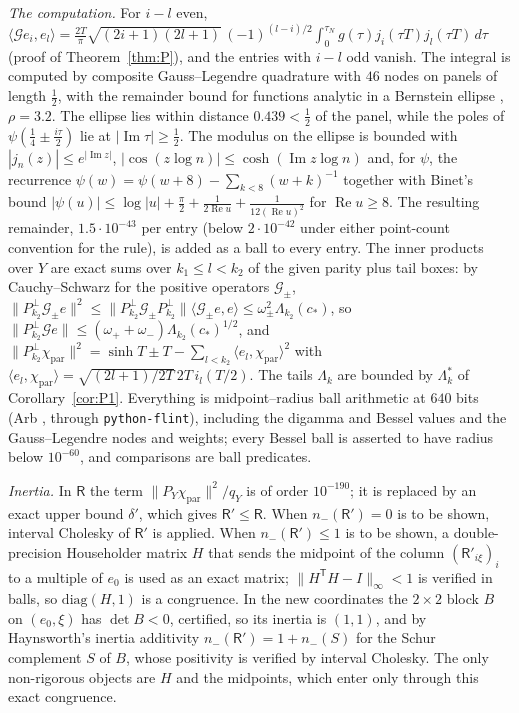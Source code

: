 \documentclass[11pt]{amsart}
\theoremstyle{definition}
\theoremstyle{remark}
\newcommand{\Rel}{\operatorname{Re}}
\newcommand{\Iml}{\operatorname{Im}}
\begin{document}
\emph{The computation.} For $i-l$ even,
$\langle\mathcal Ge_i,e_l\rangle=\frac{2T}\pi\sqrt{(2i+1)(2l+1)}\,(-1)^{(l-i)/2}\int_0^{\tau_N}g(\tau)j_i(\tau T)j_l(\tau T)\,d\tau$
(proof of Theorem~\ref{thm:P}), and the entries with $i-l$ odd vanish. The integral is computed by composite
Gauss--Legendre quadrature with $46$ nodes on panels of length $\frac12$, with the remainder bound for
functions analytic in a Bernstein ellipse \cite[Thm.~19.3]{Trefethen2013}, $\rho=3.2$. The ellipse lies
within distance $0.439<\frac12$ of the panel, while the poles of $\psi(\frac14\pm\frac{i\tau}2)$ lie at
$|\Iml\tau|\ge\frac12$. The modulus on the ellipse is bounded with $|j_n(z)|\le e^{|\Iml z|}$,
$|\cos(z\log n)|\le\cosh(\Iml z\log n)$ and, for $\psi$, the recurrence $\psi(w)=\psi(w+8)-\sum_{k<8}(w+k)^{-1}$
together with Binet's bound $|\psi(u)|\le\log|u|+\frac\pi2+\frac1{2\Rel u}+\frac1{12(\Rel u)^2}$ for
$\Rel u\ge8$. The resulting remainder, $1.5\cdot10^{-43}$ per entry (below $2\cdot10^{-42}$ under either
point-count convention for the rule), is added as a ball to every entry. The inner products over $Y$ are
exact sums over $k_1\le l<k_2$ of the given parity plus tail boxes: by Cauchy--Schwarz for the positive
operators $\mathcal G_\pm$, $\|P^\perp_{k_2}\mathcal G_\pm e\|^2\le\|P^\perp_{k_2}\mathcal G_\pm P^\perp_{k_2}\|
\langle\mathcal G_\pm e,e\rangle\le\omega_\pm^2\Lambda_{k_2}(c_*)$, so
$\|P^\perp_{k_2}\mathcal Ge\|\le(\omega_++\omega_-)\Lambda_{k_2}(c_*)^{1/2}$, and
$\|P^\perp_{k_2}\chi_{\mathrm{par}}\|^2=\sinh T\pm T-\sum_{l<k_2}\langle e_l,\chi_{\mathrm{par}}\rangle^2$ with
$\langle e_l,\chi_{\mathrm{par}}\rangle=\sqrt{(2l+1)/2T}\,2T\,i_l(T/2)$. The tails $\Lambda_k$ are bounded by
$\Lambda^*_k$ of Corollary~\ref{cor:P1}. Everything is midpoint--radius ball arithmetic at $640$ bits
(Arb \cite{Johansson2017}, through \texttt{python-flint}), including the digamma and Bessel values and the
Gauss--Legendre nodes and weights; every Bessel ball is asserted to have radius below $10^{-60}$, and
comparisons are ball predicates.

\emph{Inertia.} In $\mathsf R$ the term $\|P_Y\chi_{\mathrm{par}}\|^2/q_Y$ is of order $10^{-190}$; it is replaced
by an exact upper bound $\delta'$, which gives $\mathsf R'\le\mathsf R$. When $n_-(\mathsf R')=0$ is to be shown,
interval Cholesky of $\mathsf R'$ is applied. When $n_-(\mathsf R')\le1$ is to be shown, a double-precision
Householder matrix $H$ that sends the midpoint of the column $(\mathsf R'_{i\xi})_i$ to a multiple of $e_0$ is
used as an exact matrix; $\|H^{\mathsf T}H-I\|_\infty<1$ is verified in balls, so $\mathrm{diag}(H,1)$ is a
congruence. In the new coordinates the $2\times2$ block $B$ on $(e_0,\xi)$ has $\det B<0$, certified, so its
inertia is $(1,1)$, and by Haynsworth's inertia additivity \cite{Haynsworth1968}
$n_-(\mathsf R')=1+n_-(S)$ for the Schur complement $S$ of $B$, whose positivity is verified by interval
Cholesky. The only non-rigorous objects are $H$ and the midpoints, which enter only through this exact
congruence.
\end{document}
